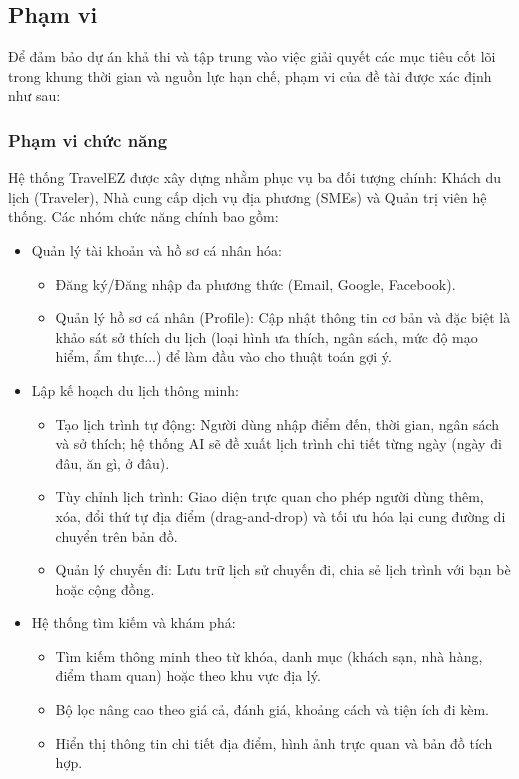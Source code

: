 \subsection{Phạm vi}
Để đảm bảo dự án khả thi và tập trung vào việc giải quyết các mục tiêu cốt lõi trong khung thời gian và nguồn lực hạn chế, phạm vi của đề tài được xác định như sau:
\subsubsection{Phạm vi chức năng}
Hệ thống TravelEZ được xây dựng nhằm phục vụ ba đối tượng chính: Khách du lịch (Traveler), Nhà cung cấp dịch vụ địa phương (SMEs) và Quản trị viên hệ thống. Các nhóm chức năng chính bao gồm:

\begin{itemize}
    \item Quản lý tài khoản và hồ sơ cá nhân hóa:
    \begin{itemize}
        \item Đăng ký/Đăng nhập đa phương thức (Email, Google, Facebook).
        \item Quản lý hồ sơ cá nhân (Profile): Cập nhật thông tin cơ bản và đặc biệt là khảo sát sở thích du lịch (loại hình ưa thích, ngân sách, mức độ mạo hiểm, ẩm thực...) để làm đầu vào cho thuật toán gợi ý.
    \end{itemize}

    \item Lập kế hoạch du lịch thông minh:
    \begin{itemize}
        \item Tạo lịch trình tự động: Người dùng nhập điểm đến, thời gian, ngân sách và sở thích; hệ thống AI sẽ đề xuất lịch trình chi tiết từng ngày (ngày đi đâu, ăn gì, ở đâu).
        \item Tùy chỉnh lịch trình: Giao diện trực quan cho phép người dùng thêm, xóa, đổi thứ tự địa điểm (drag-and-drop) và tối ưu hóa lại cung đường di chuyển trên bản đồ.
        \item Quản lý chuyến đi: Lưu trữ lịch sử chuyến đi, chia sẻ lịch trình với bạn bè hoặc cộng đồng.
    \end{itemize}

    \item Hệ thống tìm kiếm và khám phá:
    \begin{itemize}
        \item Tìm kiếm thông minh theo từ khóa, danh mục (khách sạn, nhà hàng, điểm tham quan) hoặc theo khu vực địa lý.
        \item Bộ lọc nâng cao theo giá cả, đánh giá, khoảng cách và tiện ích đi kèm.
        \item Hiển thị thông tin chi tiết địa điểm, hình ảnh trực quan và bản đồ tích hợp.
    \end{itemize}


\end{itemize}
